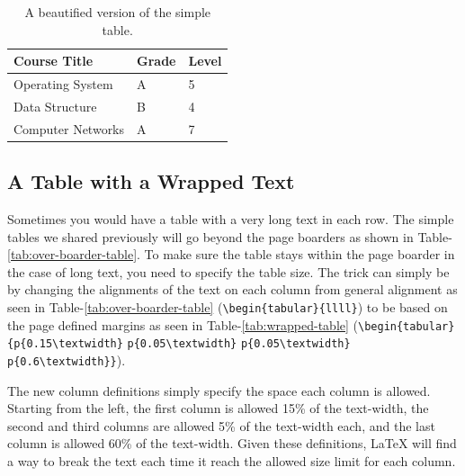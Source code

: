 \begin{table}[H]
    \centering
    \begin{tabular}{lll}
        \hline\hline
        Course Title      & Grade & Level \\ \hline\hline
        Operating System  & A     & 5     \\
        Data Structure    & B     & 4     \\
        Computer Networks & A     & 7     \\ \hline
    \end{tabular}
    \caption{A beautified version of the simple table.}
    \label{tab:simple-table-beautified}
\end{table}

\subsection{A Table with a Wrapped Text}


Sometimes you would have a table with a very long text in each row. The simple tables we shared previously will go beyond the page boarders as shown in Table-\ref{tab:over-boarder-table}. To make sure the table stays within the page boarder in the case of long text, you need to specify the table size. The trick can simply be by changing the alignments of the text on each column from general alignment as seen in Table-\ref{tab:over-boarder-table} (\verb|\begin{tabular}|\verb|{llll}|) to be based on the page defined margins as seen in Table-\ref{tab:wrapped-table} (\verb|\begin{tabular}| \verb|{p{0.15\textwidth}| \verb|p{0.05\textwidth}| \verb|p{0.05\textwidth}| \verb|p{0.6\textwidth}}|).

The new column definitions simply specify the space each column is allowed. Starting from the left, the first column is allowed 15\% of the text-width, the second and third columns are allowed 5\% of the text-width each, and the last column is allowed 60\% of the text-width. Given these definitions, {\LaTeX} will find a way to break the text each time it reach the allowed size limit for each column.


